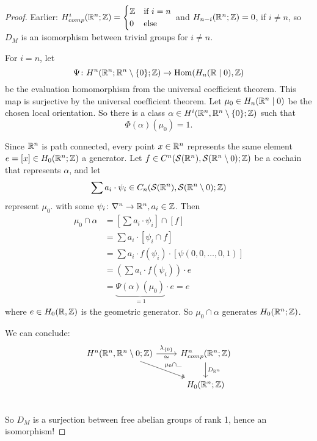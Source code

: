 \documentclass[language=english]{TemplateLecture}
\begin{document}
\begin{proof}
    Earlier: \(H^i_{comp}(\mathbb{R}^n; \mathbb{Z}) = \begin{cases}
        \mathbb{Z} & \text{if } i = n \\
        0 & \text{else} \\
    \end{cases}\)
    and \(H_{n-i}(\mathbb{R}^n; \mathbb{Z}) = 0\), if \(i \neq n\), so \(D_M\) is an isomorphism between trivial groups for \(i \neq n\).

    For \(i = n\), let
    \[\Psi\colon H^n(\mathbb{R}^n; \mathbb{R}^n\setminus \{0\}; \mathbb{Z}) \to \operatorname{Hom}(H_n(\mathbb{R} \mid 0), \mathbb{Z})\]
    be the evaluation homomorphism from the universal coefficient theorem. This map is surjective by the universal coefficient theorem. Let \(\mu_0 \in H_n(\mathbb{R}^n \mid 0)\) be the chosen local orientation. So there is a class \(\alpha \in H^i(\mathbb{R}^n, \mathbb{R}^n\setminus \{0\}; \mathbb{Z})\) such that
    \[\Phi(\alpha) (\mu_0) = 1.\]

    Since \(\mathbb{R}^n\) is path connected, every point \(x \in \mathbb{R}^n\) represents the same element \(e = [x] \in H_0(\mathbb{R}^n; \mathbb{Z})\) a generator. Let \(f \in C^n(\mathcal{S}(\mathbb{R}^n), \mathcal{S}(\mathbb{R}^n\setminus 0); \mathbb{Z})\) be a cochain that represents \(\alpha\),  and let
    \[\sum a_i \cdot \psi_i \in C_n(\mathcal{S}(\mathbb{R}^n), \mathcal{S}(\mathbb{R}^n \setminus 0); \mathbb{Z})\]
    represent \(\mu_0\). with some \(\psi_i\colon \nabla^n \to \mathbb{R}^n, a_i \in \mathbb{Z}\). Then
    \[\begin{split}
        \mu_0 \cap \alpha &= [\sum a_i \cdot \psi_i] \cap [f] \\
        &= \sum a_i \cdot [\psi_i \cap f] \\
        &= \sum a_i \cdot f(\psi_i) \cdot [\psi(0,0,\dots,0,1)] \\
        &= (\sum a_i \cdot f(\psi_i)) \cdot e \\
        &= \underbrace{\Psi(\alpha)(\mu_0)}_{= 1} \cdot e = e
    \end{split}\]
    where \(e \in H_0(\mathbb{R}, \mathbb{Z})\) is the geometric generator. So \(\mu_0 \cap \alpha\) generates \(H_0(\mathbb{R}^n; \mathbb{Z})\).

    We can conclude:
    \[\begin{tikzcd}
        {H^n(\IR^n, \IR^n\setminus 0; \IZ)} \ar[r, "\lambda_{\set 0}", "\cong"'] \ar[dr, "\mu_0 \cap \_", two heads] & H^n_{comp}(\IR^n; \IZ) \ar[d, "D_{\IR^n}"] \\
        & H_0(\IR^n; \IZ) \\
    \end{tikzcd}\]
    So \(D_M\) is a surjection between free abelian groups of rank 1, hence an isomorphism!
\end{proof}
\end{document}
